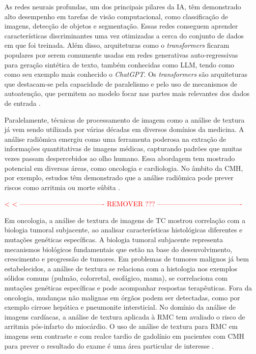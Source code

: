 As redes neurais profundas, um dos principais pilares da \gls{IA}, têm demonstrado alto desempenho em tarefas de visão computacional, como classificação de imagens, detecção de objetos e segmentação. Essas redes conseguem aprender características discriminantes uma vez otimizadas a cerca do conjunto de dados em que foi treinada. Além disso, arquiteturas como o \textit{transformers} ficaram populares por serem comumente usadas em redes generativas auto-regressivas para geração sintética de texto, também conhecidas como \gls{LLM}, tendo como como seu exemplo mais conhecido o \textit{ChatGPT}. Os \textit{transformers} são arquiteturas que destacam-se pela capacidade de paralelismo e pelo uso de mecanismos de autoatenção, que permitem ao modelo focar nas partes mais relevantes dos dados de entrada \cite{russell2020artificial}.

Paralelamente, técnicas de processamento de imagem como a análise de textura já vem sendo utilizada por várias décadas em diversos domínios da medicina. A análise radiômica emergiu como uma ferramenta poderosa na extração de informações quantitativas de imagens médicas, capturando padrões que muitas vezes passam despercebidos ao olho humano. Essa abordagem tem mostrado potencial em diversas áreas, como oncologia e cardiologia. No âmbito da \gls{CMH}, por exemplo, estudos têm demonstrado que a análise radiômica pode prever riscos como arritmia ou morte súbita \cite{schofieldTextureAnalysisCardiovascular2019a}.


\textcolor{red}{< < ------------------------------------- REMOVER ??? ------------------------------------- }

Em oncologia, a análise de textura de imagens de \gls{TC} mostrou correlação com a biologia tumoral subjacente, ao analisar características histológicas diferentes e mutações genéticas específicas. A biologia tumoral subjacente representa mecanismos biológicos fundamentais que estão na base do desenvolvimento, crescimento e progressão de tumores. Em problemas de tumores malignos já bem estabelecidos, a análise de textura se relaciona com a histologia nos exemplos sólidos comuns (pulmão, colorretal, esofágico, mama), se correlaciona com mutações genéticas específicas e pode acompanhar respostas terapêuticas. Fora da oncologia, mudanças não malignas em órgãos podem ser detectadas, como por exemplo cirrose hepática e pneumonite intersticial. No domínio da análise de imagens cardíacas, a análise de textura aplicada à \gls{RMC} tem avaliado o risco de arritmia pós-infarto do miocárdio. O uso de análise de textura para \gls{RMC} em imagens sem contraste e com realce tardio de gadolínio em pacientes com \gls{CMH} para prever o resultado do exame é uma área particular de interesse \cite{schofieldTextureAnalysisCardiovascular2019a}.

